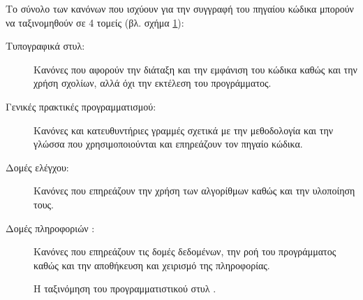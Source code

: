 \documentclass{assignment}
\begin{document}
Το σύνολο των κανόνων που ισχύουν για την συγγραφή του πηγαίου κώδικα μπορούν να ταξινομηθούν σε 4 τομείς \cite{Mohan} (βλ. σχήμα \ref{fig:style_taxonomy}):
\begin{description}
\item [Τυπογραφικά στυλ: ] Κανόνες που αφορούν την διάταξη και την εμφάνιση του κώδικα καθώς και την χρήση σχολίων, αλλά όχι την εκτέλεση του προγράμματος.
\item [Γενικές πρακτικές προγραμματισμού: ] Κανόνες και κατευθυντήριες γραμμές σχετικά με την μεθοδολογία και την γλώσσα που χρησιμοποιούνται και επηρεάζουν τον πηγαίο κώδικα.
\item [Δομές ελέγχου: ] Κανόνες που επηρεάζουν την χρήση των αλγορίθμων καθώς και την υλοποίηση τους.
\item [Δομές πληροφοριών : ] Κανόνες που επηρεάζουν τις δομές δεδομένων, την ροή του προγράμματος καθώς και την αποθήκευση και χειρισμό της πληροφορίας.
\end{description}

\begin{figure}
\begin{center}
\caption[Η ταξινόμηση του προγραμματιστικού στυλ]{Η ταξινόμηση του προγραμματιστικού στυλ \cite{Oman1991287}. }
\label{fig:style_taxonomy}
\end{center}
\end{figure}

\end{document}
